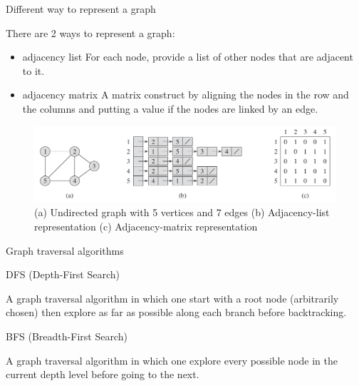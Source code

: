 \documentclass[ignorenonframetext,]{beamer}
\providecommand{\tightlist}{%
  \setlength{\itemsep}{0pt}\setlength{\parskip}{0pt}}
\begin{document}
\begin{frame}{Different way to represent a graph}
\protect\hypertarget{different-way-to-represent-a-graph}{}

There are 2 ways to represent a graph:

\begin{itemize}
\tightlist
\item
  adjacency list For each node, provide a list of other nodes that are
  adjacent to it.
\item
  adjacency matrix A matrix construct by aligning the nodes in the row
  and the columns and putting a value if the nodes are linked by an
  edge.
\end{itemize}

\begin{figure}
\centering
\includegraphics{graph-representation.png}
\caption{(a) Undirected graph with 5 vertices and 7 edges (b)
Adjacency-list representation (c) Adjacency-matrix representation}
\end{figure}

\end{frame}

\begin{frame}{Graph traversal algorithms}
\protect\hypertarget{graph-traversal-algorithms}{}

\begin{block}{DFS (Depth-First Search)}

A graph traversal algorithm in which one start with a root node
(arbitrarily chosen) then explore as far as possible along each branch
before backtracking.

\end{block}

\begin{block}{BFS (Breadth-First Search)}

A graph traversal algorithm in which one explore every possible node in
the current depth level before going to the next.

\end{block}

\end{frame}
\end{document}
